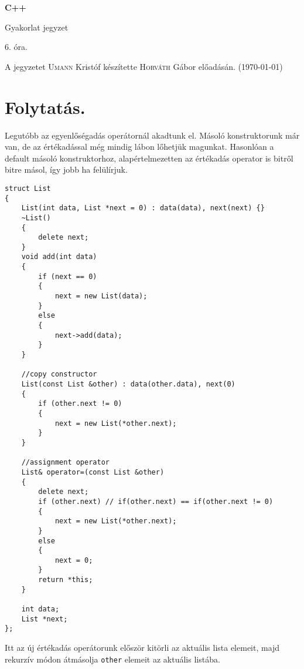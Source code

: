 \documentclass[a4paper,11.5pt]{article}
\begin{document}
	\setlength\parindent{0pt}
	\def\s{\hspace{0.2mm}\vphantom{\beta}}
	\def\Z{\mathbb{Z}}
	\def\Q{\mathbb{Q}}
	\def\R{\mathbb{R}}
	\def\C{\mathbb{C}}
	\def\N{\mathbb{N}}
	\def\Ra{\overline{\mathbb{R}}}
	
	\def\sume{\displaystyle\sum_{n=1}^{+\infty}}
	\def\sumn{\displaystyle\sum_{n=0}^{+\infty}}
	
	\def\narrow{\underset{n\rightarrow+\infty}{\longrightarrow}}
	\def\limn{\displaystyle\lim_{n\to +\infty}}
	\def\limx{\displaystyle\lim_{x\to +\infty}}
	
	\theoremstyle{definition}
	\newtheorem{theorem}{Tétel}[subsection] 
	
	\theoremstyle{definition}
	\newtheorem{definition}[theorem]{Definíció} 
	\newtheorem{example}[theorem]{Példa} 
	\newtheorem{task}[theorem]{Feladat} 
	\newtheorem{note}[theorem]{Megjegyzés}
	\begin{center}
		{\LARGE\textbf{C++}}
		
		{\Large Gyakorlat jegyzet}
		
		6. óra.
	\end{center}
	A jegyzetet \textsc{Umann} Kristóf készítette \textsc{Horváth} Gábor  előadásán. (\today)
	\section{Folytatás.}
	Legutóbb az egyenlőségadás operátornál akadtunk el. Másoló konstruktorunk már van, de az értékadással még mindig lábon lőhetjük magunkat. Hasonlóan a default másoló konstruktorhoz, alapértelmezetten az értékadás operator is bitről bitre másol, így jobb ha felülírjuk.
\begin{lstlisting}
struct List
{
	List(int data, List *next = 0) : data(data), next(next) {}
	~List()
	{
		delete next;
	}
	void add(int data)
	{
		if (next == 0)
		{
			next = new List(data);
		}
		else
		{
			next->add(data);
		}
	}
	
	//copy constructor
	List(const List &other) : data(other.data), next(0)
	{
		if (other.next != 0)
		{
			next = new List(*other.next);
		}
	}
	
	//assignment operator
	List& operator=(const List &other)
	{
		delete next;
		if (other.next) // if(other.next) == if(other.next != 0)
		{
			next = new List(*other.next);
		}
		else
		{
			next = 0;
		}
		return *this;
	}
	
	int data;
	List *next;
};
\end{lstlisting}
	Itt az új értékadás operátorunk először kitörli az aktuális lista elemeit, majd rekurzív módon átmásolja \texttt{other} elemeit az aktuális listába.
	
\end{document}
